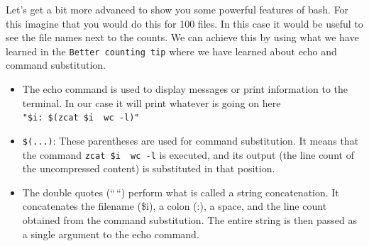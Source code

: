 \documentclass[
  letterpaper,
  DIV=11,
  numbers=noendperiod]{scrreprt}
\newenvironment{Shaded}{}{}
\newcommand{\AttributeTok}[1]{\textcolor[rgb]{0.84,0.23,0.29}{#1}}
\newcommand{\BuiltInTok}[1]{\textcolor[rgb]{0.84,0.23,0.29}{#1}}
\newcommand{\ControlFlowTok}[1]{\textcolor[rgb]{0.84,0.23,0.29}{#1}}
\newcommand{\FunctionTok}[1]{\textcolor[rgb]{0.44,0.26,0.76}{#1}}
\newcommand{\KeywordTok}[1]{\textcolor[rgb]{0.84,0.23,0.29}{#1}}
\newcommand{\NormalTok}[1]{\textcolor[rgb]{0.14,0.16,0.18}{#1}}
\newcommand{\PreprocessorTok}[1]{\textcolor[rgb]{0.84,0.23,0.29}{#1}}
\newcommand{\StringTok}[1]{\textcolor[rgb]{0.01,0.18,0.38}{#1}}
\newcommand{\VariableTok}[1]{\textcolor[rgb]{0.89,0.38,0.04}{#1}}
\providecommand{\tightlist}{%
  \setlength{\itemsep}{0pt}\setlength{\parskip}{0pt}}\usepackage{longtable,booktabs,array}
\begin{document}
\begin{tcolorbox}[enhanced jigsaw, breakable, left=2mm, title=\textcolor{quarto-callout-tip-color}{\faLightbulb}\hspace{0.5em}{Avanced Tip: Better counting in for loops}, opacityback=0, opacitybacktitle=0.6, rightrule=.15mm, bottomrule=.15mm, colback=white, colframe=quarto-callout-tip-color-frame, coltitle=black, bottomtitle=1mm, arc=.35mm, toprule=.15mm, colbacktitle=quarto-callout-tip-color!10!white, toptitle=1mm, titlerule=0mm, leftrule=.75mm]

Let's get a bit more advanced to show you some powerful features of
bash. For this imagine that you would do this for 100 files. In this
case it would be useful to see the file names next to the counts. We can
achieve this by using what we have learned in the
\texttt{Better\ counting\ tip} where we have learned about echo and
command substitution.

\begin{Shaded}
\end{Shaded}

\begin{itemize}
\tightlist
\item
  The echo command is used to display messages or print information to
  the terminal. In our case it will print whatever is going on here
  \texttt{"\$i:\ \$(zcat\ \$i\ \textbar{}\ wc\ -l)"}
\item
  \texttt{\$(...)}: These parentheses are used for command substitution.
  It means that the command \texttt{zcat\ \$i\ \textbar{}\ wc\ -l} is
  executed, and its output (the line count of the uncompressed content)
  is substituted in that position.
\item
  The double quotes (``\,``) perform what is called a string
  concatenation. It concatenates the filename (\$i), a colon (:), a
  space, and the line count obtained from the command substitution. The
  entire string is then passed as a single argument to the echo command.
\end{itemize}


\end{tcolorbox}
\end{document}
